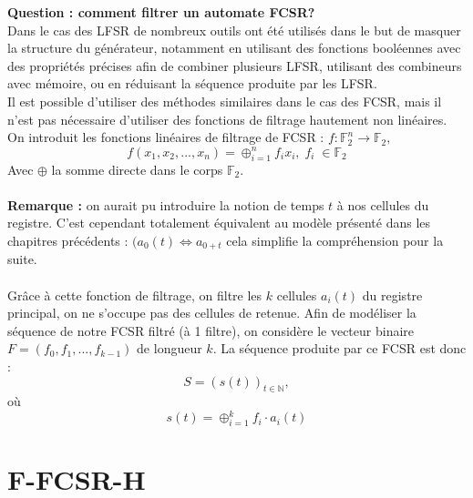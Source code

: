 \documentclass[11pt]{report}
\begin{document}
\textbf{Question : comment filtrer un automate FCSR?}\\
Dans le cas des LFSR de nombreux outils ont été utilisés dans le but de masquer la structure du générateur, notamment en utilisant des fonctions booléennes avec des propriétés précises afin de combiner plusieurs LFSR, utilisant des combineurs avec mémoire, ou en réduisant la séquence produite par les LFSR.\\
Il est possible d'utiliser des méthodes similaires dans le cas des FCSR, mais il n'est pas nécessaire d'utiliser des fonctions de filtrage hautement non linéaires. 
\\
On introduit les fonctions linéaires de filtrage de FCSR : 
$
f: \mathbb{F}_2^n \rightarrow \mathbb{F}_2,
$
$$
f(x_1,x_2,...,x_n) = \oplus_{i=1}^n f_ix_i, \; f_i \; \in \mathbb{F}_2
$$
Avec $\oplus$ la somme directe dans le corps $\mathbb{F}_2$.
\\\\
\textbf{Remarque :} on aurait pu introduire la notion de temps $t$ à nos cellules du registre. C'est cependant totalement équivalent au modèle présenté dans les chapitres précédents : $(a_0(t) \Leftrightarrow a_{0+t}$ cela simplifie la compréhension pour la suite. \\\\
Grâce à cette fonction de filtrage, on filtre les $k$ cellules $a_i(t)$ du registre principal, on ne s'occupe pas des cellules de retenue. Afin de modéliser la séquence de notre FCSR filtré (à 1 filtre), on considère le vecteur binaire $F=(f_0,f_1,...,f_{k-1})$ de longueur $k$. La séquence produite par ce FCSR est donc :
$$
S=(s(t))_{t \in \mathbb{N}},
$$
où
$$
s(t) = \oplus_{i=1}^k f_i \cdot a_i(t)
$$

\section{F-FCSR-H}
\end{document}
